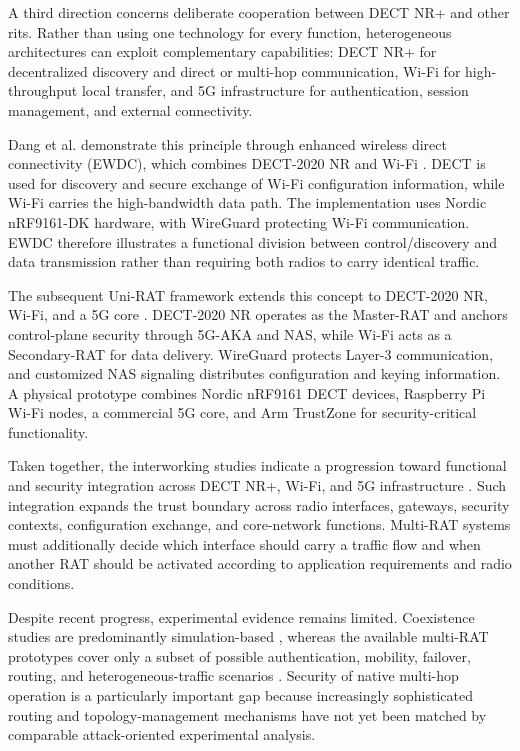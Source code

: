 A third direction concerns deliberate cooperation between DECT NR+ and other
\glspl{rit}. Rather than using one technology for every function,
heterogeneous architectures can exploit complementary capabilities: DECT NR+
for decentralized discovery and direct or multi-hop communication, Wi-Fi for
high-throughput local transfer, and 5G infrastructure for authentication,
session management, and external connectivity.

Dang et al. demonstrate this principle through enhanced wireless direct
connectivity (EWDC), which combines DECT-2020 NR and Wi-Fi
\cite{dangEWDCIntegratingDECT20202025a}. DECT is used for discovery and secure
exchange of Wi-Fi configuration information, while Wi-Fi carries the
high-bandwidth data path. The implementation uses Nordic nRF9161-DK hardware,
with WireGuard protecting Wi-Fi communication. EWDC therefore illustrates a
functional division between control/discovery and data transmission rather
than requiring both radios to carry identical traffic.

The subsequent Uni-RAT framework extends this concept to DECT-2020 NR, Wi-Fi,
and a 5G core
\cite{dangUniRATUnifiedDECT20202026}. DECT-2020 NR operates as the Master-RAT
and anchors control-plane security through 5G-AKA and NAS, while Wi-Fi acts as
a Secondary-RAT for data delivery. WireGuard protects Layer-3 communication,
and customized NAS signaling distributes configuration and keying
information. A physical prototype combines Nordic nRF9161 DECT devices,
Raspberry Pi Wi-Fi nodes, a commercial 5G core, and Arm TrustZone for
security-critical functionality.

Taken together, the interworking studies indicate a progression toward
functional and security integration across DECT NR+, Wi-Fi, and 5G
infrastructure
\cite{dangEWDCIntegratingDECT20202025a,
dangUniRATUnifiedDECT20202026}. Such integration expands the trust boundary
across radio interfaces, gateways, security contexts, configuration exchange,
and core-network functions. Multi-RAT systems must additionally decide which
interface should carry a traffic flow and when another RAT should be activated
according to application requirements and radio conditions.

Despite recent progress, experimental evidence remains limited. Coexistence
studies are predominantly simulation-based
\cite{samuylovPerformanceAssessmentDECT20202023,
samuylovPerformanceDECT2020NR2025}, whereas the available multi-RAT
prototypes cover only a subset of possible authentication, mobility, failover,
routing, and heterogeneous-traffic scenarios
\cite{dangEWDCIntegratingDECT20202025a,
dangUniRATUnifiedDECT20202026}. Security of native multi-hop operation is a
particularly important gap because increasingly sophisticated routing and
topology-management mechanisms have not yet been matched by comparable
attack-oriented experimental analysis.

